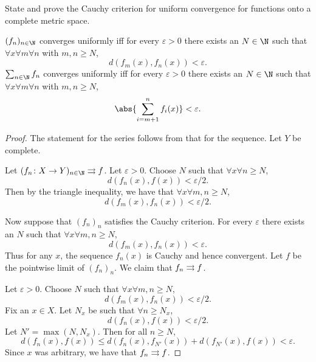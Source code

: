 \begin{exercise} \label{thm:ssfn:cauchy}
    State and prove the Cauchy criterion for uniform convergence
    for functions onto a complete metric space.
\end{exercise}
\begin{solution}
    $(f_n)_{n \in \N}$ converges uniformly iff for every $\varepsilon > 0$
    there exists an $N \in \N$ such that $\forall x \forall m \forall n$
    with $m, n \ge N$, \[
        d(f_m(x), f_n(x)) < \varepsilon.
    \]
    $\sum_{n \in \N} f_n$ converges uniformly iff for every
    $\varepsilon > 0$ there exists an $N \in \N$ such that
    $\forall x \forall m \forall n$ with $m, n \ge N$, \[
        \abs{\sum_{i = m+1}^n f_i(x)} < \varepsilon.
    \]
    \begin{proof}
        The statement for the series follows from that for the sequence.
        Let $Y$ be complete.

        Let $(f_n\colon X \to Y)_{n \in \N} \unifto f$.
        Let $\varepsilon > 0$.
        Choose $N$ such that $\forall x \forall n \ge N$, \[
            d(f_n(x), f(x)) < \varepsilon/2.
        \] Then by the triangle inequality, we have that
        $\forall x \forall m, n \ge N$, \[
            d(f_m(x), f_n(x)) < \varepsilon/2.
        \]

        Now suppose that $(f_n)_n$ satisfies the Cauchy criterion.
        For every $\varepsilon$ there exists an $N$ such that
        $\forall x \forall m, n \ge N$, \[
            d(f_m(x), f_n(x)) < \varepsilon.
        \] Thus for any $x$, the sequence $f_n(x)$ is Cauchy and hence
        convergent.
        Let $f$ be the pointwise limit of $(f_n)_n$.
        We claim that $f_n \rightrightarrows f$.

        Let $\varepsilon > 0$.
        Choose $N$ such that $\forall x \forall m, n \ge N$, \[
            d(f_m(x), f_n(x)) < \varepsilon/2.
        \] Fix an $x \in X$.
        Let $N_x$ be such that $\forall n \ge N_x$, \[
            d(f_n(x), f(x)) < \varepsilon/2.
        \] Let $N' = \max(N, N_x)$.
        Then for all $n \ge N$, \[
            d(f_n(x), f(x)) \le d(f_n(x), f_{N'}(x)) + d(f_{N'}(x), f(x))
            < \varepsilon.
        \] Since $x$ was arbitrary, we have that $f_n \rightrightarrows f$.
        \renewcommand{\qedsymbol}{\ensuremath{\square\blacksquare}}
    \end{proof}%
    \renewcommand{\qedsymbol}{}%
\end{solution}

